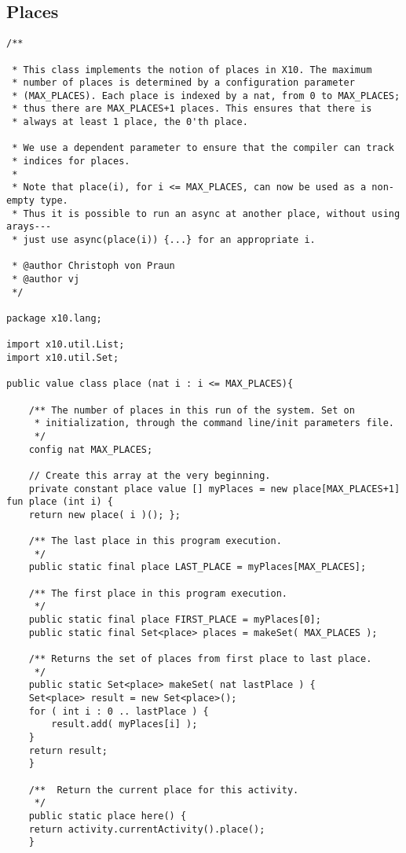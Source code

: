 \documentclass[nocopyrightspace,preprint,9pt]{sigplanconf}
\begin{document}
\subsection{Places}
{\footnotesize
\begin{verbatim}
/**

 * This class implements the notion of places in X10. The maximum
 * number of places is determined by a configuration parameter
 * (MAX_PLACES). Each place is indexed by a nat, from 0 to MAX_PLACES;
 * thus there are MAX_PLACES+1 places. This ensures that there is
 * always at least 1 place, the 0'th place.

 * We use a dependent parameter to ensure that the compiler can track
 * indices for places.
 *
 * Note that place(i), for i <= MAX_PLACES, can now be used as a non-empty type.
 * Thus it is possible to run an async at another place, without using arays---
 * just use async(place(i)) {...} for an appropriate i.

 * @author Christoph von Praun
 * @author vj
 */

package x10.lang;

import x10.util.List;
import x10.util.Set;

public value class place (nat i : i <= MAX_PLACES){

    /** The number of places in this run of the system. Set on
     * initialization, through the command line/init parameters file.
     */
    config nat MAX_PLACES;

    // Create this array at the very beginning.
    private constant place value [] myPlaces = new place[MAX_PLACES+1] fun place (int i) {
	return new place( i )(); };

    /** The last place in this program execution.
     */
    public static final place LAST_PLACE = myPlaces[MAX_PLACES];

    /** The first place in this program execution.
     */
    public static final place FIRST_PLACE = myPlaces[0];
    public static final Set<place> places = makeSet( MAX_PLACES );

    /** Returns the set of places from first place to last place.
     */
    public static Set<place> makeSet( nat lastPlace ) {
	Set<place> result = new Set<place>();
	for ( int i : 0 .. lastPlace ) {
	    result.add( myPlaces[i] );
	}
	return result;
    }

    /**  Return the current place for this activity.
     */
    public static place here() {
	return activity.currentActivity().place();
    }


\end{verbatim}}
\end{document}
